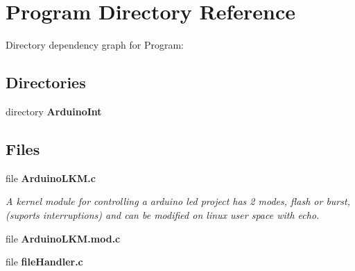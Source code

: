 \section{Program Directory Reference}
\label{dir_dd9648d51d0cc76533772683c862213b}
Directory dependency graph for Program\-:
\subsection*{Directories}
\begin{DoxyCompactItemize}
\item 
directory {\bf Arduino\-Int}
\end{DoxyCompactItemize}
\subsection*{Files}
\begin{DoxyCompactItemize}
\item 
file {\bf Arduino\-L\-K\-M.\-c}
\begin{DoxyCompactList}\small\item\em A kernel module for controlling a arduino led project has 2 modes, flash or burst, (suports interruptions) and can be modified on linux user space with echo. \end{DoxyCompactList}\item 
file {\bf Arduino\-L\-K\-M.\-mod.\-c}
\item 
file {\bf file\-Handler.\-c}
\end{DoxyCompactItemize}
